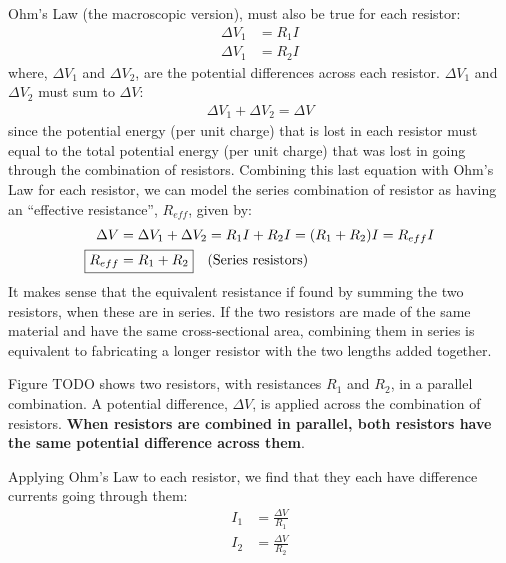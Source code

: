 Ohm's Law (the macroscopic version), must also be true for each resistor:
\begin{align*}
\Delta V_1 &= R_1I\\
\Delta V_1 &= R_2I
\end{align*}
where, $\Delta V_1$ and $\Delta V_2$, are the potential differences across each resistor. $\Delta V_1$ and $\Delta V_2$ must sum to $\Delta V$:
\begin{align*}
\Delta V_1 + \Delta V_2=\Delta V
\end{align*}
since the potential energy (per unit charge) that is lost in each resistor must equal to the total potential energy (per unit charge) that was lost in going through the combination of resistors. Combining this last equation with Ohm's Law for each resistor, we can model the series combination of resistor as having an ``effective resistance'', $R_{eff}$, given by:
\begin{align*}
\Delta V &= \Delta V_1 + \Delta V_2=R_1I+R_2I=(R_1+R_2)I=R_{eff}I\\
 \Aboxed{R_{eff}&=R_1+R_2}\quad \text{(Series resistors)}
\end{align*}
It makes sense that the equivalent resistance if found by summing the two resistors, when these are in series. If the two resistors are made of the same material and have the same cross-sectional area, combining them in series is equivalent to fabricating a longer resistor with the two lengths added together.

Figure TODO shows two resistors, with resistances $R_1$ and $R_2$, in a parallel combination. A potential difference, $\Delta V$, is applied across the combination of resistors. \textbf{When resistors are combined in parallel, both resistors have the same potential difference across them}.

Applying Ohm's Law to each resistor, we find that they each have difference currents going through them:
\begin{align*}
I_1&=\frac{\Delta V}{R_1}\\
I_2&=\frac{\Delta V}{R_2}
\end{align*}

